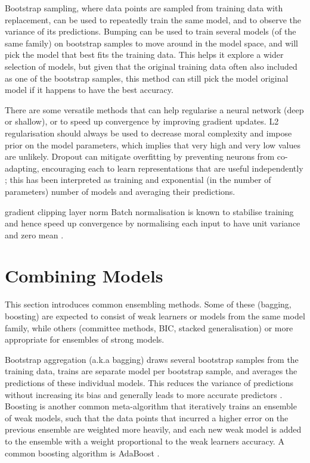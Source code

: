 Bootstrap sampling, where data points are sampled from training data with replacement, can be used to repeatedly train the same model, and to observe the variance of its predictions.
Bumping can be used to train several models (of the same family) on bootstrap samples to move around in the model space, and will pick the model that best fits the training data.
This helps it explore a wider selection of models, but given that the original training data often also included as one of the bootstrap samples, this method  can still pick the model original model if it happens to have the best accuracy.

There are some versatile methods that can help regularise a neural network (deep or shallow), or to speed up convergence by improving  gradient updates.
L2  regularisation should always be used to decrease moral complexity and impose prior on the model parameters, which  implies that very high and very low values are unlikely.
Dropout can mitigate overfitting by preventing neurons from co-adapting, encouraging each to learn representations that are useful independently \cite{dropout}; this has been interpreted as training and exponential (in the number of parameters) number of models and averaging their predictions.

gradient clipping
layer norm
Batch normalisation is known to stabilise training and hence speed up convergence  by normalising each input to have unit variance and zero mean \cite{batch_norm}.

\section{Combining Models}
\label{bg_ensembling}

This section  introduces common ensembling methods.
Some of these (bagging, boosting)  are expected to consist of weak learners or models from the same model family, while others (committee methods, BIC, stacked generalisation) or more appropriate for ensembles of strong models.

Bootstrap aggregation (a.k.a bagging)   draws several bootstrap samples  from the training data,  trains are separate model per bootstrap sample,  and averages the predictions of these individual models.  This reduces the variance of predictions without increasing its bias and generally leads to  more accurate predictors \cite{bagging}.
Boosting is another common meta-algorithm that iteratively trains an ensemble of weak models, such that the data points that incurred a higher error on the previous ensemble are weighted more heavily, and each new weak model is added to the ensemble with a weight proportional to the weak learners accuracy.
A common boosting algorithm is AdaBoost \cite{adaboost}.

